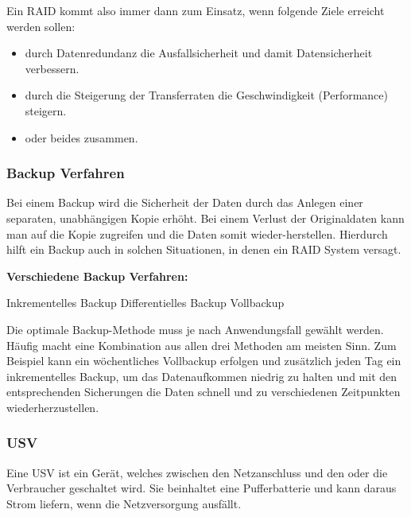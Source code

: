 \documentclass[asp1.tex]{subfiles}
\begin{document}
Ein RAID kommt also immer dann zum Einsatz, wenn folgende Ziele erreicht werden sollen:
\begin{itemize}
    \item durch Datenredundanz die Ausfallsicherheit und damit Datensicherheit verbessern.
    \item durch die Steigerung der Transferraten die Geschwindigkeit (Performance) steigern.
    \item oder beides zusammen.
\end{itemize}



\subsubsection{Backup Verfahren}

Bei einem Backup wird die Sicherheit der Daten durch das Anlegen einer separaten, unabhängigen Kopie erhöht. Bei einem Verlust der Originaldaten kann man auf die Kopie zugreifen und die Daten somit wieder-herstellen. Hierdurch hilft ein Backup auch in solchen Situationen, in denen ein RAID System versagt.

\textbf{Verschiedene Backup Verfahren:}
\begin{outline}
    \1 Inkrementelles Backup
    \1 Differentielles Backup
    \1 Vollbackup
\end{outline}

Die optimale Backup-Methode muss je nach Anwendungsfall gewählt werden. Häufig macht eine Kombination aus allen drei Methoden am meisten Sinn. Zum Beispiel kann ein wöchentliches Vollbackup erfolgen und zusätzlich jeden Tag ein inkrementelles Backup, um das Datenaufkommen niedrig zu halten und mit den entsprechenden Sicherungen die Daten schnell und zu verschiedenen Zeitpunkten wiederherzustellen.


\subsubsection{USV}

Eine USV ist ein Gerät, welches zwischen den Netzanschluss und den oder die Verbraucher geschaltet wird. Sie beinhaltet eine Pufferbatterie und kann daraus Strom liefern, wenn die Netzversorgung ausfällt.


\break
\end{document}
